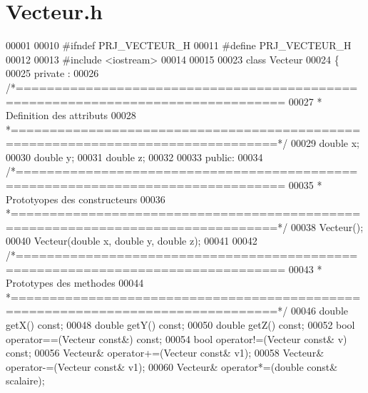 \section{Vecteur.\+h}
\label{_vecteur_8h_source}

\begin{DoxyCode}
00001 
00010 \textcolor{preprocessor}{#ifndef PRJ\_VECTEUR\_H}
00011 \textcolor{preprocessor}{#define PRJ\_VECTEUR\_H}
00012 
00013 \textcolor{preprocessor}{#include <iostream>}
00014 
00015 
00023 \textcolor{keyword}{class }Vecteur
00024 \{
00025     \textcolor{keyword}{private} :
00026 \textcolor{comment}{/*================================================================================}
00027 \textcolor{comment}{ * Definition des attributs}
00028 \textcolor{comment}{ *================================================================================*/}
00029     \textcolor{keywordtype}{double} x;
00030     \textcolor{keywordtype}{double} y;
00031     \textcolor{keywordtype}{double} z;
00032     
00033     \textcolor{keyword}{public}:
00034 \textcolor{comment}{/*================================================================================}
00035 \textcolor{comment}{ * Prototyopes des constructeurs}
00036 \textcolor{comment}{ *================================================================================*/}
00038     Vecteur();
00040     Vecteur(\textcolor{keywordtype}{double} x, \textcolor{keywordtype}{double} y, \textcolor{keywordtype}{double} z);
00041     
00042 \textcolor{comment}{/*================================================================================}
00043 \textcolor{comment}{ * Prototypes des methodes}
00044 \textcolor{comment}{ *================================================================================*/}
00046     \textcolor{keywordtype}{double} getX() \textcolor{keyword}{const};
00048     \textcolor{keywordtype}{double} getY() \textcolor{keyword}{const};
00050     \textcolor{keywordtype}{double} getZ() \textcolor{keyword}{const};
00052     \textcolor{keywordtype}{bool} operator==(Vecteur \textcolor{keyword}{const}&) \textcolor{keyword}{const};
00054     \textcolor{keywordtype}{bool} operator!=(Vecteur \textcolor{keyword}{const}& v) \textcolor{keyword}{const};
00056     Vecteur& operator+=(Vecteur \textcolor{keyword}{const}& v1);
00058     Vecteur& operator-=(Vecteur \textcolor{keyword}{const}& v1);
00060     Vecteur& operator*=(\textcolor{keywordtype}{double} \textcolor{keyword}{const}& scalaire);    

\end{DoxyCode}
